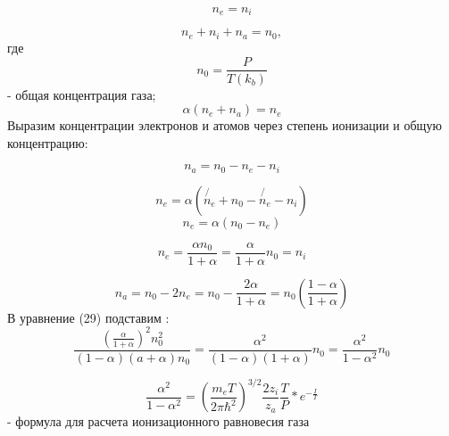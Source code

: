 \documentclass[letterpaper,12pt]{article}
\begin{document}
\begin{equation} \label{eq:aperp} %
n_e = n_i
\end{equation}

\begin{equation} \label{eq:aperp} %
n_e + n_i + n_a = n_0,
\end{equation}
где
\begin{equation} \label{eq:aperp} %
n_0=\frac{P}{T(k_b)}
\end{equation}
- общая концентрация газа;
\begin{equation} \label{eq:aperp} %
\alpha(n_e+n_a)=n_e
\end{equation}
Выразим концентрации электронов и атомов через степень ионизации и общую концентрацию:

\begin{equation} \label{eq:aperp} %
n_a=n_0-n_e-n_i
\end{equation}

\begin{equation} \label{eq:aperp} %
n_e =\alpha(\not{n_e} + n_0 - \not{n_e} - n_i)
\end{equation}
\begin{equation} \label{eq:aperp} %
n_e = \alpha(n_0 - n_e)
\end{equation}

\begin{equation} \label{eq:aperp} %
n_e = \frac{\alpha n_0}{1+ \alpha} = \frac{\alpha}{1+\alpha}n_0=n_i
\end{equation}

\begin{equation} \label{eq:aperp} %
n_a = n_0 - 2n_e = n_0 - \frac{2 \alpha}{1+ \alpha}=n_0(\frac{1 - \alpha}{1 + \alpha })
\end{equation}
В уравнение (29) подставим :
\begin{equation} \label{eq:aperp} %
\frac{(\frac{\alpha}{1+\alpha})^2n_0^2}{(1-\alpha)(a+\alpha)n_0}=\frac{\alpha^2}{(1-\alpha)(1+\alpha)}n_0=\frac{\alpha^2}{1-\alpha^2}n_0
\end{equation}

\begin{equation} \label{eq:aperp} %
\frac{\alpha^2}{1-\alpha^2}=(\frac{m_e T}{2 \pi \hbar^2})^{3/2}\frac{2 z_i}{z_a}\frac{T}{P}*e^{-\frac{I}{T}}
\end{equation}
- формула для расчета ионизационного равновесия газа
\end{document}
